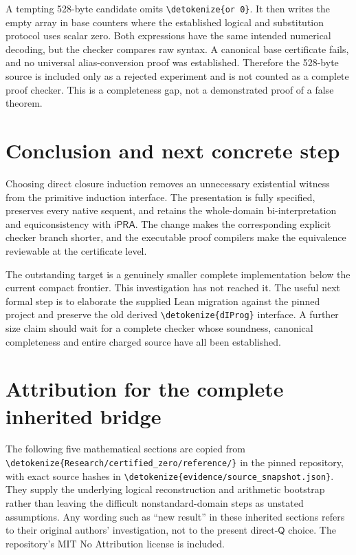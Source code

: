 \documentclass[11pt,letterpaper]{article}
\theoremstyle{definition}\newtheorem{definition}[theorem]{Definition}
\theoremstyle{remark}\newtheorem{remark}[theorem]{Remark}
\newcommand{\ipra}{\ensuremath{\mathsf{iPRA}}}
\newcommand{\Q}{\mathsf Q}
\newcommand{\file}[1]{\expandafter\nolinkurl\expandafter{\detokenize{#1}}}
\begin{document}
A tempting 528-byte candidate omits \file{or 0}. It then writes the
empty array in base counters where the established logical and substitution
protocol uses scalar zero. Both expressions have the same intended
numerical decoding, but the checker compares raw syntax. A canonical
base certificate fails, and no universal alias-conversion proof was
established. Therefore the 528-byte source is included only as a rejected
experiment and is not counted as a complete proof checker. This is a
completeness gap, not a demonstrated proof of a false theorem.

\section{Conclusion and next concrete step}

Choosing direct closure induction removes an unnecessary existential
witness from the primitive induction interface. The presentation is
fully specified, preserves every native sequent, and retains the
whole-domain bi-interpretation and equiconsistency with \ipra. The
change makes the corresponding explicit checker branch shorter, and
the executable proof compilers make the equivalence reviewable at the
certificate level.

The outstanding target is a genuinely smaller complete implementation
below the current compact frontier. This investigation has not reached
it. The useful next formal step is to elaborate the supplied Lean
migration against the pinned project and preserve the old derived
\file{dIProg} interface. A further size claim should wait for a complete
checker whose soundness, canonical completeness and entire charged source
have all been established.

\appendix
\clearpage
\section{Attribution for the complete inherited bridge}

The following five mathematical sections are copied from
\file{Research/certified_zero/reference/} in the pinned repository,
with exact source hashes in \file{evidence/source_snapshot.json}.
They supply the underlying logical reconstruction and arithmetic
bootstrap rather than leaving the difficult nonstandard-domain steps
as unstated assumptions. Any wording such as ``new result'' in these
inherited sections refers to their original authors' investigation,
not to the present direct-$\Q$ choice. The repository's MIT No
Attribution license is included.
\end{document}
